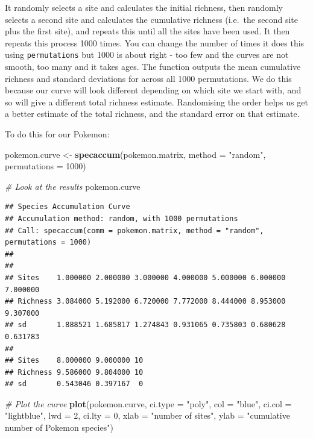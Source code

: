 \documentclass[]{book}
\newenvironment{Shaded}{\begin{snugshade}}{\end{snugshade}}
\newcommand{\KeywordTok}[1]{\textcolor[rgb]{0.13,0.29,0.53}{\textbf{{#1}}}}
\newcommand{\DataTypeTok}[1]{\textcolor[rgb]{0.13,0.29,0.53}{{#1}}}
\newcommand{\DecValTok}[1]{\textcolor[rgb]{0.00,0.00,0.81}{{#1}}}
\newcommand{\StringTok}[1]{\textcolor[rgb]{0.31,0.60,0.02}{{#1}}}
\newcommand{\CommentTok}[1]{\textcolor[rgb]{0.56,0.35,0.01}{\textit{{#1}}}}
\newcommand{\NormalTok}[1]{{#1}}
\begin{document}
It randomly selects a site and calculates the initial richness, then
randomly selects a second site and calculates the cumulative richness
(i.e.~the second site plus the first site), and repeats this until all
the sites have been used. It then repeats this process 1000 times. You
can change the number of times it does this using \texttt{permutations}
but 1000 is about right - too few and the curves are not smooth, too
many and it takes ages. The function outputs the mean cumulative
richness and standard deviations for across all 1000 permutations. We do
this because our curve will look different depending on which site we
start with, and so will give a different total richness estimate.
Randomising the order helps us get a better estimate of the total
richness, and the standard error on that estimate.

To do this for our Pokemon:

\begin{Shaded}
\begin{Highlighting}[]
\NormalTok{pokemon.curve <-}\StringTok{ }\KeywordTok{specaccum}\NormalTok{(pokemon.matrix, }\DataTypeTok{method =} \StringTok{"random"}\NormalTok{, }\DataTypeTok{permutations =} \DecValTok{1000}\NormalTok{)}

\CommentTok{# Look at the results}
\NormalTok{pokemon.curve}
\end{Highlighting}
\end{Shaded}

\begin{verbatim}
## Species Accumulation Curve
## Accumulation method: random, with 1000 permutations
## Call: specaccum(comm = pokemon.matrix, method = "random", permutations = 1000) 
## 
##                                                                        
## Sites    1.000000 2.000000 3.000000 4.000000 5.000000 6.000000 7.000000
## Richness 3.084000 5.192000 6.720000 7.772000 8.444000 8.953000 9.307000
## sd       1.888521 1.685817 1.274843 0.931065 0.735803 0.680628 0.631783
##                              
## Sites    8.000000 9.000000 10
## Richness 9.586000 9.804000 10
## sd       0.543046 0.397167  0
\end{verbatim}

\begin{Shaded}
\begin{Highlighting}[]
\CommentTok{# Plot the curve}
\KeywordTok{plot}\NormalTok{(pokemon.curve, }\DataTypeTok{ci.type =} \StringTok{"poly"}\NormalTok{, }\DataTypeTok{col =} \StringTok{"blue"}\NormalTok{, }\DataTypeTok{ci.col =} \StringTok{"lightblue"}\NormalTok{, }
     \DataTypeTok{lwd =} \DecValTok{2}\NormalTok{, }\DataTypeTok{ci.lty =} \DecValTok{0}\NormalTok{, }\DataTypeTok{xlab =} \StringTok{"number of sites"}\NormalTok{, }
     \DataTypeTok{ylab =} \StringTok{"cumulative number of Pokemon species"}\NormalTok{)}
\end{Highlighting}
\end{Shaded}
\end{document}
